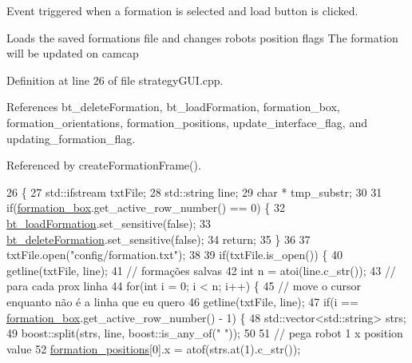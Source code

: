 Event triggered when a formation is selected and \textquotesingle{}load\textquotesingle{} button is clicked. 

Loads the saved formations file and changes robot\textquotesingle{}s position flags The formation will be updated on camcap 

Definition at line 26 of file strategy\+G\+U\+I.\+cpp.



References bt\+\_\+delete\+Formation, bt\+\_\+load\+Formation, formation\+\_\+box, formation\+\_\+orientations, formation\+\_\+positions, update\+\_\+interface\+\_\+flag, and updating\+\_\+formation\+\_\+flag.



Referenced by create\+Formation\+Frame().


\begin{DoxyCode}
26                                                   \{
27     std::ifstream txtFile;
28     std::string line;
29     \textcolor{keywordtype}{char} * tmp\_substr;
30 
31     \textcolor{keywordflow}{if}(\hyperlink{class_strategy_g_u_i_a0f2ab3a2cdca1663def9c4ec1e366a5d}{formation\_box}.get\_active\_row\_number() == 0) \{
32         \hyperlink{class_strategy_g_u_i_a89efee7959e39e3c993080d88262521d}{bt\_loadFormation}.set\_sensitive(\textcolor{keyword}{false});
33         \hyperlink{class_strategy_g_u_i_acce16be9100c9d09a3a9ca2087b8370b}{bt\_deleteFormation}.set\_sensitive(\textcolor{keyword}{false});
34         \textcolor{keywordflow}{return};
35     \}
36 
37     txtFile.open(\textcolor{stringliteral}{"config/formation.txt"});
38 
39     \textcolor{keywordflow}{if}(txtFile.is\_open()) \{
40         getline(txtFile, line);
41         \textcolor{comment}{// formações salvas}
42         \textcolor{keywordtype}{int} n = atoi(line.c\_str());
43         \textcolor{comment}{// para cada prox linha}
44         \textcolor{keywordflow}{for}(\textcolor{keywordtype}{int} i = 0; i < n; i++) \{
45             \textcolor{comment}{// move o cursor enquanto não é a linha que eu quero}
46             getline(txtFile, line);
47             \textcolor{keywordflow}{if}(i == \hyperlink{class_strategy_g_u_i_a0f2ab3a2cdca1663def9c4ec1e366a5d}{formation\_box}.get\_active\_row\_number() - 1) \{
48                 std::vector<std::string> strs;
49                 boost::split(strs, line, boost::is\_any\_of(\textcolor{stringliteral}{" "}));
50 
51                 \textcolor{comment}{// pega robot 1 x position value}
52                 \hyperlink{class_strategy_g_u_i_a4d2d15fe0a25b8d9d8fa56a4cf155ff0}{formation\_positions}[0].x = atof(strs.at(1).c\_str());

\end{DoxyCode}
